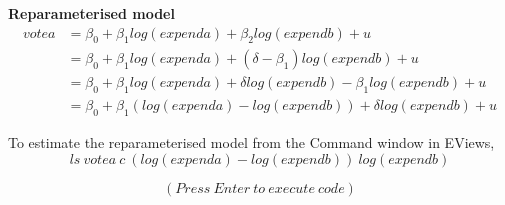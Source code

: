 \documentclass[12pt]{report}
\begin{document}
\noindent \textbf{Reparameterised model}
\begin{align*}
	votea &= \beta_0 + \beta_1log(expenda) + \beta_2log(expendb) + u \\
	&= \beta_0 + \beta_1log(expenda) + (\delta - \beta_1)log(expendb) + u \\
	&= \beta_0 + \beta_1log(expenda) + {\delta}log(expendb) - \beta_1log(expendb) + u \\
	&= \beta_0 + \beta_1(log(expenda)-log(expendb)) + {\delta}log(expendb) + u
\end{align*}

\newpage
\noindent To estimate the reparameterised model from the Command window in EViews,
$$ls\ votea\ c\ (log(expenda)-log(expendb))\ log(expendb)$$
\begin{figure}[H]
	\centering
\end{figure}
\vspace{-\baselineskip}
$$(Press\ Enter\ to\ execute\ code)$$
\end{document}
